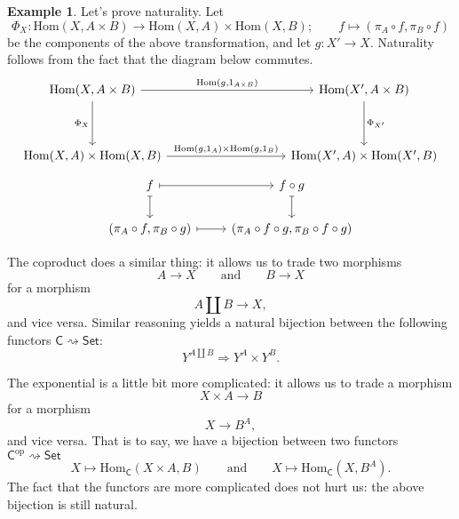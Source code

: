 \documentclass[a4paper,10pt]{scrreprt}
\newcommand{\Hom}{\mathrm{Hom}}
\theoremstyle{definition}
\newtheorem{example}{Example}[section]
\theoremstyle{plain}
\theoremstyle{remark}
\begin{document}
\begin{example}
  Let's prove naturality. Let
  \begin{equation*}
    \Phi_{X}\colon \Hom(X, A \times B) \to \Hom(X, A) \times \Hom(X, B);\qquad f \mapsto (\pi_{A} \circ f, \pi_{B} \circ f)
  \end{equation*}
  be the components of the above transformation, and let $g\colon X' \to X$. Naturality follows from the fact that the diagram below commutes.
  \begin{equation*}
    \begin{tikzcd}[row sep=huge, column sep=huge]
      \Hom(X, A \times B)
      \arrow[rr, "{\Hom(g, 1_{A \times B})}"]
      \arrow[d, swap, "\Phi_{X}"]
      & & \Hom(X', A \times B)
      \arrow[d, "\Phi_{X'}"]
      \\
      \Hom(X, A) \times \Hom(X, B)
      \arrow[rr, "{\Hom(g, 1_{A}) \times \Hom(g, 1_{B})}"]
      & & \Hom(X', A) \times \Hom(X', B)
    \end{tikzcd}
  \end{equation*}
  \begin{equation*}
    \begin{tikzcd}
      f
      \arrow[r, mapsto]
      \arrow[d, mapsto]
      & f \circ g
      \arrow[d, mapsto]
      \\
      (\pi_{A} \circ f, \pi_{B} \circ g)
      \arrow[r, mapsto]
      & (\pi_{A} \circ f \circ g, \pi_{B} \circ f \circ g)
    \end{tikzcd}
  \end{equation*}

  The coproduct does a similar thing: it allows us to trade two morphisms
  \begin{equation*}
    A \to X\qquad\text{and}\qquad B \to X
  \end{equation*}
  for a morphism
  \begin{equation*}
    A \amalg B \to X,
  \end{equation*}
  and vice versa. Similar reasoning yields a natural bijection between the following functors $\mathsf{C} \rightsquigarrow \mathsf{Set}$:
  \begin{equation*}
    Y^{A \amalg B} \Rightarrow Y^{A} \times Y^{B}.
  \end{equation*}

  The exponential is a little bit more complicated: it allows us to trade a morphism
  \begin{equation*}
    X \times A \to B
  \end{equation*}
  for a morphism 
  \begin{equation*}
    X \to B^{A},
  \end{equation*}
  and vice versa.  That is to say, we have a bijection between two functors $\mathsf{C}^{\mathrm{op}} \rightsquigarrow \mathsf{Set}$
  \begin{equation*}
    X \mapsto \Hom_{\mathsf{C}}(X \times A, B)\qquad\text{and}\qquad X \mapsto \Hom_{\mathsf{C}}(X, B^{A}).
  \end{equation*}
  The fact that the functors are more complicated does not hurt us: the above bijection is still natural.
\end{example}
\end{document}
